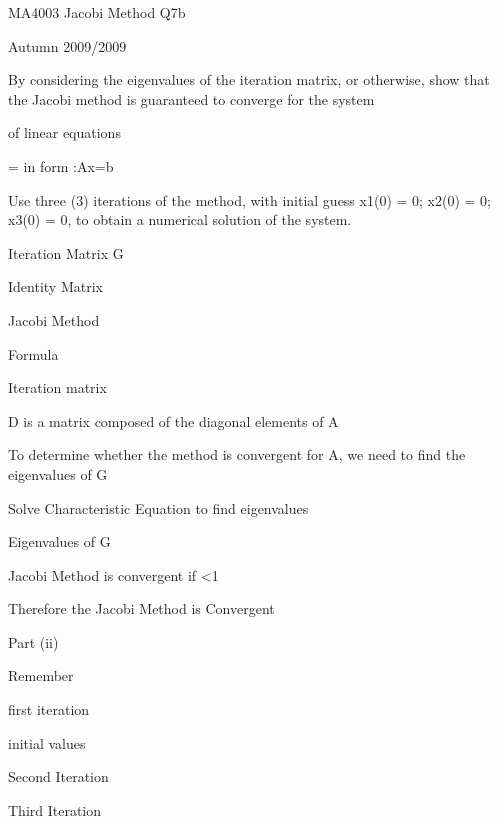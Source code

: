 
MA4003 Jacobi Method Q7b

Autumn 2009/2009

By considering the eigenvalues of the iteration matrix, or otherwise, show that the Jacobi method is guaranteed to converge for the system

of linear equations 

 


 =                 in form :Ax=b


Use three (3) iterations of the method, with initial guess x1(0) = 0; x2(0) = 0; x3(0) = 0, to obtain a numerical solution of the system.

 


Iteration Matrix  G

 

 Identity Matrix 

 

 

 

 

 

 

 

 

 

 

 

 

 

 

 

 

Jacobi Method

Formula                            

Iteration matrix                            

                           

                                          

 



D is a matrix composed of the diagonal elements of A





To determine whether the method is convergent for A, we need to find the eigenvalues of G



Solve  Characteristic Equation to find eigenvalues



Eigenvalues of G               

Jacobi Method is convergent if <1

              Therefore the Jacobi Method is Convergent

Part (ii)



Remember                             



first iteration

 

initial values              



Second Iteration



Third Iteration



 

